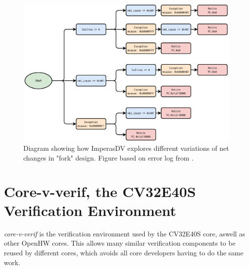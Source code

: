 \begin{figure}
    \centering
    \includegraphics[width=1.0\linewidth]{figures/ImperasExecution.pdf}
    \caption{Diagram showing how ImperasDV explores different variations of net changes in "fork" design. Figure based on error log from \cite{ISSMismatchPending2023}. }
    \label{fig:imperasFork}
\end{figure}

%
%
%
%
%




\section{Core-v-verif, the CV32E40S Verification Environment}
\label{sec:bg_core-v-verif}

\textit{core-v-verif} \cite{openhwgroupOpenhwgroupCorevverif2023} is the verification environment used by the CV32E40S core, aswell as other OpenHW cores. This allows many similar verification components to be reused by different cores, which avoids all core developers having to do the same work.

